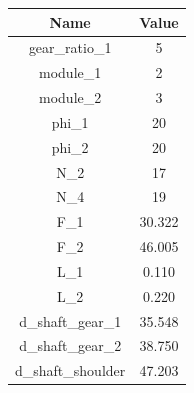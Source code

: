 \begin{tabular}{|c|c|}
\hline
Name & Value \\ \hline

gear_ratio_1 & 5 \\ \hline
module_1 & 2 \\ \hline
module_2 & 3 \\ \hline
phi_1 & 20 \\ \hline
phi_2 & 20 \\ \hline
N_2 & 17 \\ \hline
N_4 & 19 \\ \hline
F_1 & 30.322 \\ \hline
F_2 & 46.005 \\ \hline
L_1 & 0.110 \\ \hline
L_2 & 0.220 \\ \hline
d_shaft_gear_1 & 35.548 \\ \hline
d_shaft_gear_2 & 38.750 \\ \hline
d_shaft_shoulder & 47.203 \\ \hline

\end{tabular}
